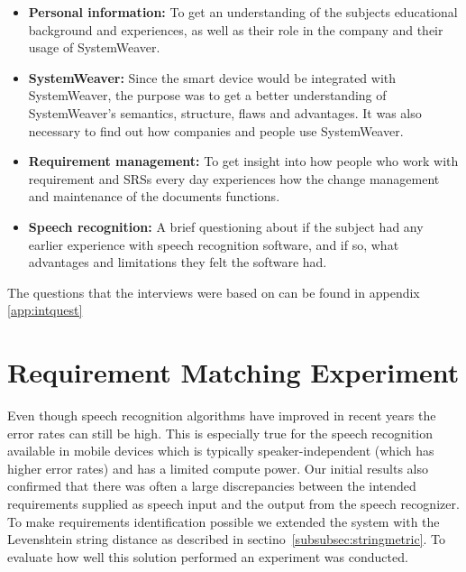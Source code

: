 \begin{itemize}
    \item \textbf{Personal information:} To get an understanding of the subjects educational background and experiences, as well as their role in the company and their usage of SystemWeaver.
    \item \textbf{SystemWeaver:} Since the smart device would be integrated with SystemWeaver, the purpose was to get a better understanding of SystemWeaver's semantics, structure, flaws and advantages. It was also necessary to find out how companies and people use SystemWeaver.
    \item \textbf{Requirement management:} To get insight into how people who work with requirement and SRSs every day experiences how the change management and maintenance of the documents functions.
    \item \textbf{Speech recognition:} A brief questioning about if the subject had any earlier experience with speech recognition software, and if so, what advantages and limitations they felt the software had.
\end{itemize}

The questions that the interviews were based on can be found in appendix \ref{app:intquest}

\section{Requirement Matching Experiment}
\label{sec:reqmatchexp}
Even though speech recognition algorithms have improved in recent years the error rates can still be high.
This is especially true for the speech recognition available in mobile devices which is typically speaker-independent (which has higher error rates) and has a limited compute power.
Our initial results also confirmed that there was often a large discrepancies between the intended requirements supplied as speech input and the output from the speech recognizer.
To make requirements identification possible we extended the system with the Levenshtein string distance as described in sectino~\ref{subsubsec:stringmetric}.
To evaluate how well this solution performed an experiment was conducted.

